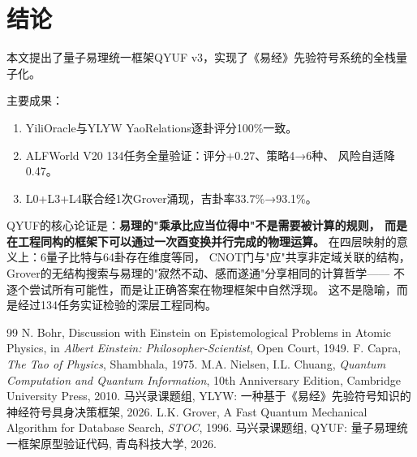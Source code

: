 \documentclass[twocolumn]{article}
\begin{document}
\section{结论}

本文提出了量子易理统一框架QYUF v3，实现了《易经》先验符号系统的全栈量子化。

主要成果：
\begin{enumerate}
  \item YiliOracle与YLYW YaoRelations逐卦评分100\%一致。
  \item ALFWorld V20 134任务全量验证：评分+0.27、策略4→6种、
        风险自适降0.47。
  \item L0+L3+L4联合经1次Grover涌现，吉卦率33.7\%→93.1\%。
\end{enumerate}

QYUF的核心论证是：\textbf{易理的"乘承比应当位得中"不是需要被计算的规则，
而是在工程同构的框架下可以通过一次酉变换并行完成的物理运算。}
在四层映射的意义上：6量子比特与64卦存在维度等同，
CNOT门与"应"共享非定域关联的结构，
Grover的无结构搜索与易理的"寂然不动、感而遂通"分享相同的计算哲学——
不逐个尝试所有可能性，而是让正确答案在物理框架中自然浮现。
这不是隐喻，而是经过134任务实证检验的深层工程同构。

\begin{thebibliography}{99}
 N. Bohr, Discussion with Einstein on Epistemological Problems in Atomic Physics, in \textit{Albert Einstein: Philosopher-Scientist}, Open Court, 1949.
 F. Capra, \textit{The Tao of Physics}, Shambhala, 1975.
 M.A. Nielsen, I.L. Chuang, \textit{Quantum Computation and Quantum Information}, 10th Anniversary Edition, Cambridge University Press, 2010.
 马兴录课题组, YLYW: 一种基于《易经》先验符号知识的神经符号具身决策框架, 2026.
 L.K. Grover, A Fast Quantum Mechanical Algorithm for Database Search, \textit{STOC}, 1996.
 马兴录课题组, QYUF: 量子易理统一框架原型验证代码, 青岛科技大学, 2026.
\end{thebibliography}
\end{document}
